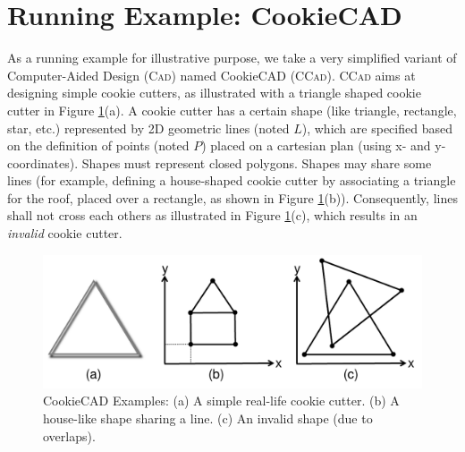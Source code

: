 \section{Running Example: CookieCAD}
\label{sec:Examples}

As a running example for illustrative purpose, we take a very simplified variant of 
Computer-Aided Design (\textsc{Cad}) named CookieCAD (\textsc{CCad}). 
\textsc{CCad} aims at designing simple cookie cutters, as illustrated with a triangle shaped cookie cutter in Figure \ref{fig:CookieCAD}(a). A cookie cutter has a certain shape (like 
triangle, rectangle, star, etc.) represented by 2D geometric lines (noted 
$L$), which are specified based on the definition of points (noted $P$) placed 
on a cartesian plan (using x- and y-coordinates). Shapes must represent 
closed polygons. Shapes may share some lines (for example, defining a 
house-shaped cookie cutter by associating a triangle for the roof, placed over a 
rectangle, as shown in Figure \ref{fig:CookieCAD}(b)). Consequently, lines shall not cross each others as illustrated in Figure \ref{fig:CookieCAD}(c), which results in an \emph{invalid} cookie cutter.

\begin{figure}[t]
   \centering
   \includegraphics[width=\columnwidth]{CookieCAD.pdf}
   \caption{CookieCAD Examples: (a) A simple real-life cookie cutter. (b) A 
house-like shape sharing a line. (c) An invalid shape (due to overlaps).}%
   \label{fig:CookieCAD}
\end{figure}


